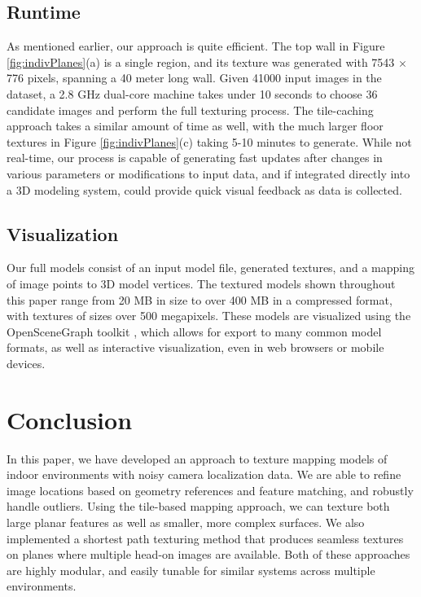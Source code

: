 \documentclass[]{spie}  %
\begin{document}
\subsection{Runtime}
As mentioned earlier, our approach is quite efficient. The top wall in
Figure \ref{fig:indivPlanes}(a) is a single region, and its texture
was generated with 7543 $\times$ 776 pixels, spanning a 40 meter long
wall. Given 41000 input images in the dataset, a 2.8 GHz dual-core
machine takes under 10 seconds to choose 36 candidate images and
perform the full texturing process. The tile-caching approach takes a
similar amount of time as well, with the much larger floor textures in
Figure \ref{fig:indivPlanes}(c) taking 5-10 minutes to generate.
While not real-time, our process is capable of generating fast updates
after changes in various parameters or modifications to input data,
and if integrated directly into a 3D modeling system, could provide
quick visual feedback as data is collected.


\subsection{Visualization}
Our full models consist of an input model file, generated textures,
and a mapping of image points to 3D model vertices. The textured
models shown throughout this paper range from 20 MB in size to over
400 MB in a compressed format, with textures of sizes over 500
megapixels. These models are visualized using the OpenSceneGraph
toolkit \cite{openscenegraph}, which allows for export to many common
model formats, as well as interactive visualization, even in web
browsers or mobile devices.

\section{Conclusion}
\label{sec:conclusion}

In this paper, we have developed an approach to texture mapping models
of indoor environments with noisy camera localization data. We are
able to refine image locations based on geometry references and
feature matching, and robustly handle outliers. Using the tile-based
mapping approach, we can texture both large planar features as well as
smaller, more complex surfaces. We also implemented a shortest path
texturing method that produces seamless textures on planes where
multiple head-on images are available. Both of these approaches are
highly modular, and easily tunable for similar systems across multiple
environments.
\end{document}
